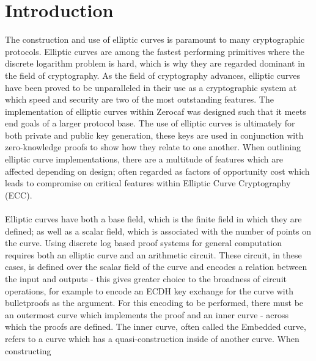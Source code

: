 \documentclass{article}
\begin{document}
\section{Introduction}
The construction and use of elliptic curves is paramount to many cryptographic protocols. Elliptic curves are among the fastest performing primitives where the discrete logarithm problem is hard, which is why they are regarded dominant in the field of cryptography. As the field of cryptography advances, elliptic curves have been proved to be unparalleled in their use as a cryptographic system at which speed and security are two of the most outstanding features. The implementation of elliptic curves within Zerocaf was designed such that it meets end goals of a larger protocol base. The use of elliptic curves is ultimately for both private and public key generation, these keys are used in conjunction with zero-knowledge proofs to show how they relate to one another. When outlining elliptic curve implementations, there are a multitude of features which are affected depending on design; often regarded as factors of opportunity cost which leads to compromise on critical features within Elliptic Curve Cryptography (ECC).\\\\  Elliptic curves have both a base field, which is the finite field in which they are defined; as well as a scalar field, which is associated with the number of points on the curve. Using discrete log based proof systems for general computation requires both an elliptic curve and an arithmetic circuit. These circuit, in these cases, is defined over the scalar field of the curve and encodes a relation between the input and outputs - this gives greater choice to the broadness of circuit operations, for example to encode an ECDH key exchange for the curve with bulletproofs as the argument. For this encoding to be performed, there must be an outermost curve which implements the proof and an inner curve - across which the proofs are defined. The inner curve, often called the Embedded curve, refers to a curve which has a quasi-construction inside of another curve. When constructing   \\\\
\end{document}
